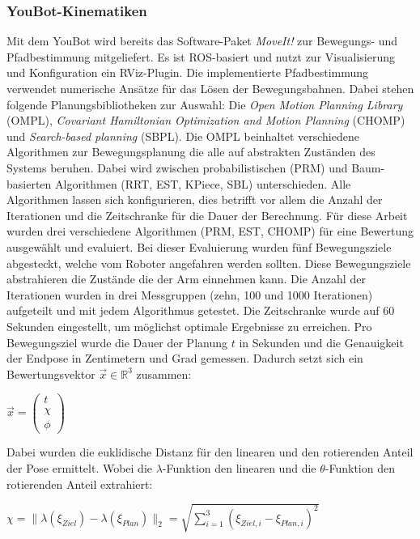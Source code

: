 \subsubsection{YouBot-Kinematiken}
Mit dem YouBot wird bereits das Software-Paket \textit{MoveIt!} zur Bewegungs- und Pfadbestimmung mitgeliefert. Es ist ROS-basiert und nutzt zur Visualisierung und Konfiguration ein RViz-Plugin. Die implementierte Pfadbestimmung verwendet numerische Ansätze für das Lösen der Bewegungsbahnen. Dabei stehen folgende Planungsbibliotheken zur Auswahl: Die \textit{Open Motion Planning Library} (OMPL), \textit{Covariant Hamiltonian Optimization and Motion Planning} (CHOMP) und \textit{Search-based planning} (SBPL). Die OMPL beinhaltet verschiedene Algorithmen zur Bewegungsplanung die alle auf abstrakten Zuständen des Systems beruhen. Dabei wird zwischen probabilistischen (PRM) und Baum-basierten Algorithmen (RRT, EST, KPiece, SBL) unterschieden. Alle Algorithmen lassen sich konfigurieren, dies betrifft vor allem die Anzahl der Iterationen und die Zeitschranke für die Dauer der Berechnung. Für diese Arbeit wurden drei verschiedene Algorithmen (PRM, EST, CHOMP) für eine Bewertung ausgewählt und evaluiert. Bei dieser Evaluierung wurden fünf Bewegungsziele abgesteckt, welche vom Roboter angefahren werden sollten. Diese Bewegungsziele abstrahieren die Zustände die der Arm einnehmen kann. Die Anzahl der Iterationen wurden in drei Messgruppen (zehn, 100 und 1000 Iterationen) aufgeteilt und mit jedem Algorithmus getestet. Die Zeitschranke wurde auf 60 Sekunden eingestellt, um möglichst optimale Ergebnisse zu erreichen. Pro Bewegungsziel wurde die Dauer der Planung $t$ in Sekunden und die Genauigkeit der Endpose in Zentimetern und Grad gemessen. Dadurch setzt sich ein Bewertungsvektor $\vec{x} \in  \mathbb{R}^3$ zusammen:

\begin{math}
	\vec{x} = \left(\begin{array}{c} t \\ \chi \\ \phi \end{array}\right)	
\end{math}

Dabei wurden die euklidische Distanz für den linearen und den rotierenden Anteil der Pose ermittelt. Wobei die $\lambda$-Funktion den linearen und die $\theta$-Funktion den rotierenden Anteil extrahiert: 

\begin{math}
	\chi = \|\lambda(\xi_{Ziel}) - \lambda(\xi_{Plan})\|_2 = \sqrt{\sum_{i=1}^{3}(\xi_{Ziel,i}-\xi_{Plan,i})^2}	
\end{math}

